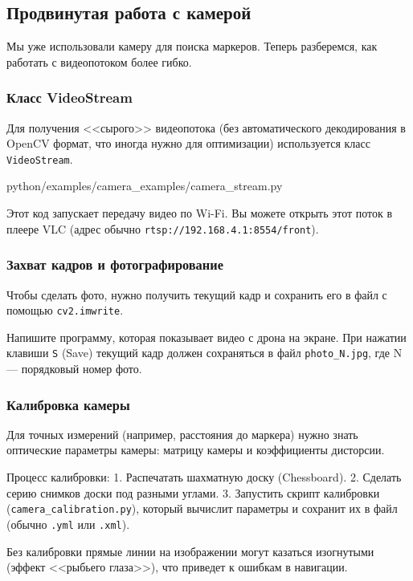 \subsection{Продвинутая работа с камерой}

Мы уже использовали камеру для поиска маркеров. Теперь разберемся, как работать с видеопотоком более гибко.

\subsubsection*{Класс VideoStream}
Для получения <<сырого>> видеопотока (без автоматического декодирования в OpenCV формат, что иногда нужно для оптимизации) используется класс \texttt{VideoStream}.

\begin{codefile}[python]{python/examples/camera_examples/camera_stream.py}
\end{codefile}

Этот код запускает передачу видео по Wi-Fi. Вы можете открыть этот поток в плеере VLC (адрес обычно \texttt{rtsp://192.168.4.1:8554/front}).

\subsubsection*{Захват кадров и фотографирование}
Чтобы сделать фото, нужно получить текущий кадр и сохранить его в файл с помощью \texttt{cv2.imwrite}.

\begin{taskbox}[Фотограф]
Напишите программу, которая показывает видео с дрона на экране. При нажатии клавиши \texttt{S} (Save) текущий кадр должен сохраняться в файл \texttt{photo\_N.jpg}, где N — порядковый номер фото.
\end{taskbox}

\subsubsection*{Калибровка камеры}
Для точных измерений (например, расстояния до маркера) нужно знать оптические параметры камеры: матрицу камеры и коэффициенты дисторсии.

Процесс калибровки:
1. Распечатать шахматную доску (Chessboard).
2. Сделать серию снимков доски под разными углами.
3. Запустить скрипт калибровки (\texttt{camera\_calibration.py}), который вычислит параметры и сохранит их в файл (обычно \texttt{.yml} или \texttt{.xml}).

\begin{infobox}
Без калибровки прямые линии на изображении могут казаться изогнутыми (эффект <<рыбьего глаза>>), что приведет к ошибкам в навигации.
\end{infobox}
